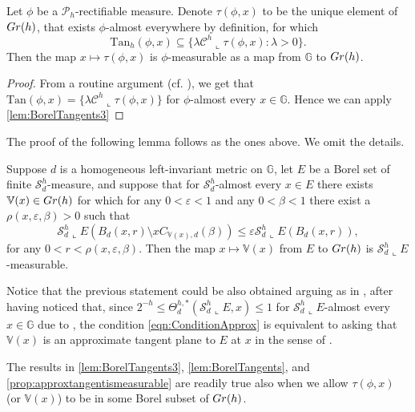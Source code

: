 \documentclass[10pt, a4paper,
oneside, headinclude,footinclude]{scrartcl}
\begin{document}
\begin{lemma}\label{lem:BorelTangents}
Let $\phi$ be a $\mathscr{P}_h$-rectifiable measure. Denote $\tau(\phi,x)$ to be the unique element of $Gr(h)$, that exists $\phi$-almost everywhere by definition, for which
$$
\mathrm{Tan}_h(\phi,x)\subseteq\{\lambda\mathcal{C}^h\llcorner \tau(\phi,x):\lambda>0\}.
$$
Then the map $x\mapsto \tau(\phi,x)$ is $\phi$-measurable as a map from $\mathbb{G}$ to $Gr(h)$.
\end{lemma}

\begin{proof}
From a routine argument (cf. \cite[Remark 14.4(3)]{Mattila1995GeometrySpaces}), we get that $\mathrm{Tan}(\phi,x)=\{\lambda\mathcal{C}^h\llcorner\tau(\phi,x)\}$ for $\phi$-almost every $x\in\mathbb G$. Hence we can apply \cref{lem:BorelTangents3}
\end{proof}


The proof of the following lemma follows as the ones above. We omit the details.

\begin{lemma}\label{prop:approxtangentismeasurable}
Suppose $d$ is a homogeneous left-invariant metric on $\mathbb{G}$, let $E$ be a Borel set of finite $\mathcal{S}^h_{d}$-measure, and suppose that for $\mathcal{S}^h_{d}$-almost every $x\in E$ there exists $\mathbb V(x)\in Gr(h)$ for which for any $0<\varepsilon<1$ and any $0<\beta<1$ there exist a $\rho(x,\varepsilon,\beta)>0$ such that
\begin{equation}\label{eqn:ConditionApprox}
\mathcal{S}^h_{d}\llcorner E(B_{d}(x,r)\setminus xC_{\mathbb{V}(x),{d}}(\beta))\leq \varepsilon \mathcal{S}^h_{d}\llcorner E(B_d(x,r)),
\end{equation}
for any $0<r<\rho(x,\varepsilon,\beta)$. Then the map $x\mapsto \mathbb{V}(x)$ from $E$ to $Gr(h)$ is $\mathcal{S}^h_{d}\llcorner E$-measurable.
\end{lemma}

Notice that the previous statement could be also obtained arguing as in \cite[Proposition 3.9]{MatSerSC}, after having noticed that, since $2^{-h}\leq \Theta^{h,*}_{d}(\mathcal{S}^h_{d}\llcorner E,x)\leq 1$ for $\mathcal{S}^h_{d}\llcorner E$-almost every $x\in\mathbb G$ due to \cite[2.10.19(1) and 2.10.19(5)]{Federer1996GeometricTheory}, the condition \eqref{eqn:ConditionApprox} is equivalent to asking that $\mathbb V(x)$ is an approximate tangent plane to $E$ at $x$ in the sense of \cite[Equation (3.2)]{MatSerSC}.

\begin{osservazione}
The results in \cref{lem:BorelTangents3}, \cref{lem:BorelTangents}, and \cref{prop:approxtangentismeasurable} are readily true also when we allow $\tau(\phi,x)$ (or $\mathbb V(x)$) to be in some Borel subset of $Gr(h)$.
\end{osservazione}
\end{document}
